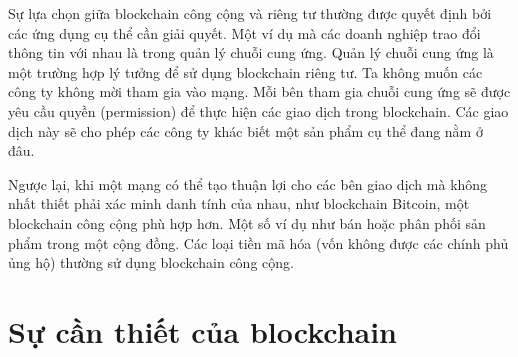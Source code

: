 Sự lựa chọn giữa blockchain công cộng và riêng tư thường được quyết định bởi các ứng dụng cụ thể cần giải quyết. Một ví dụ mà các doanh nghiệp trao đổi thông tin với nhau là trong quản lý chuỗi cung ứng. Quản lý chuỗi cung ứng là một trường hợp lý tưởng để sử dụng blockchain riêng tư. Ta không muốn các công ty không mời tham gia vào mạng. Mỗi bên tham gia chuỗi cung ứng sẽ được yêu cầu quyền (permission) để thực hiện các giao dịch trong blockchain. Các giao dịch này sẽ cho phép các công ty khác biết một sản phẩm cụ thể đang nằm ở đâu.

Ngược lại, khi một mạng có thể tạo thuận lợi cho các bên giao dịch mà không nhất thiết phải xác minh danh tính của nhau, như blockchain Bitcoin, một blockchain công cộng phù hợp hơn. Một số ví dụ như bán hoặc phân phối sản phẩm trong một cộng đồng. Các loại tiền mã hóa (vốn không được các chính phủ ủng hộ) thường sử dụng blockchain công cộng.

\section{Sự cần thiết của blockchain}

